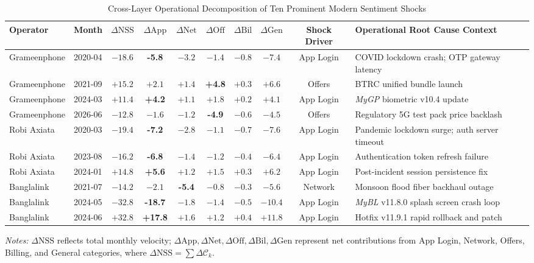 \documentclass[review,12pt,authoryear]{elsarticle}
\begin{document}
\begin{table}[t]
\centering
\caption{Cross-Layer Operational Decomposition of Ten Prominent Modern Sentiment Shocks}
\label{tab:shocks}
\footnotesize
\setlength{\tabcolsep}{4pt}
\begin{tabularx}{\textwidth}{@{}llcccccccX@{}}
\toprule
Operator & Month & $\Delta\text{NSS}$ & $\Delta\text{App}$ & $\Delta\text{Net}$ & $\Delta\text{Off}$ & $\Delta\text{Bil}$ & $\Delta\text{Gen}$ & Shock Driver & Operational Root Cause Context \\
\midrule
Grameenphone & 2020-04 & $-18.6$ & \textbf{-5.8} & $-3.2$ & $-1.4$ & $-0.8$ & $-7.4$ & App Login & COVID lockdown crash; OTP gateway latency \\
Grameenphone & 2021-09 & $+15.2$ & $+2.1$ & $+1.4$ & \textbf{+4.8} & $+0.3$ & $+6.6$ & Offers & BTRC unified bundle launch \\
Grameenphone & 2024-03 & $+11.4$ & \textbf{+4.2} & $+1.1$ & $+1.8$ & $+0.2$ & $+4.1$ & App Login & \textit{MyGP} biometric v10.4 update \\
Grameenphone & 2026-06 & $-12.8$ & $-1.6$ & $-1.2$ & \textbf{-4.9} & $-0.6$ & $-4.5$ & Offers & Regulatory 5G test pack price backlash \\
\addlinespace
Robi Axiata & 2020-03 & $-19.4$ & \textbf{-7.2} & $-2.8$ & $-1.1$ & $-0.7$ & $-7.6$ & App Login & Pandemic lockdown surge; auth server timeout \\
Robi Axiata & 2023-08 & $-16.2$ & \textbf{-6.8} & $-1.4$ & $-1.2$ & $-0.4$ & $-6.4$ & App Login & Authentication token refresh failure \\
Robi Axiata & 2024-01 & $+14.8$ & \textbf{+5.6} & $+1.2$ & $+1.5$ & $+0.3$ & $+6.2$ & App Login & Post-incident session persistence fix \\
\addlinespace
Banglalink & 2021-07 & $-14.2$ & $-2.1$ & \textbf{-5.4} & $-0.8$ & $-0.3$ & $-5.6$ & Network & Monsoon flood fiber backhaul outage \\
Banglalink & 2024-05 & $-32.8$ & \textbf{-18.7} & $-1.8$ & $-1.4$ & $-0.5$ & $-10.4$ & App Login & \textit{MyBL} v11.8.0 splash screen crash loop \\
Banglalink & 2024-06 & $+32.8$ & \textbf{+17.8} & $+1.6$ & $+1.2$ & $+0.4$ & $+11.8$ & App Login & Hotfix v11.9.1 rapid rollback and patch \\
\bottomrule
\end{tabularx}
\vspace{0.4em}
\parbox{\textwidth}{\footnotesize \textit{Notes:} $\Delta\text{NSS}$ reflects total monthly velocity; $\Delta\text{App}, \Delta\text{Net}, \Delta\text{Off}, \Delta\text{Bil}, \Delta\text{Gen}$ represent net contributions from App Login, Network, Offers, Billing, and General categories, where $\Delta\text{NSS} = \sum \Delta \mathcal{C}_k$.}
\end{table}
\end{document}
